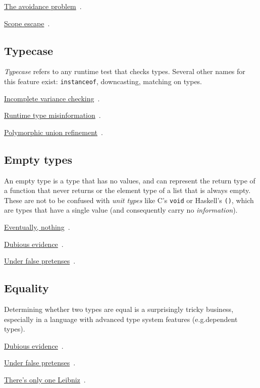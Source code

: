 \documentclass[11pt,oneside]{article}
\newcommand{\code}[1]{\texttt{#1}}
\newenvironment{indexlist}
  {\par\vspace{0.3\baselineskip}\begingroup
   \setlength{\parindent}{0pt}\setlength{\parskip}{1pt}\small}
  {\endgroup\par\vspace{0.2\baselineskip}}
\newcommand{\indexitem}[2]{%
  \makebox[1.2em]{}\hyperref[#1]{#2}%
  \nobreak\hspace{0.4em}\textcolor{sageline}{\leaders\hbox{\,.\,}\hfill}%
  \hspace{0.4em}\nobreak\textcolor{stone}{\pageref{#1}}\par}
\begin{document}
\begin{indexlist}
\indexitem{ce:avoidance}{The avoidance problem}
\indexitem{ce:scope-escape}{Scope escape}
\end{indexlist}

\subsection*{Typecase}\label{gloss:typecase}
\emph{Typecase} refers to any runtime test that checks types. Several other names for this feature exist: \code{instanceof}, downcasting, matching on types.

\begin{indexlist}
\indexitem{ce:incomplete-variance}{Incomplete variance checking}
\indexitem{ce:runtime-misinformation}{Runtime type misinformation}
\indexitem{ce:polymorphic-union-refinement}{Polymorphic union refinement}
\end{indexlist}

\subsection*{Empty types}\label{gloss:empty-types}
An empty type is a type that has no values, and can represent the return type of a function that never returns or the element type of a list that is always empty. These are not to be confused with \emph{unit types} like C's \code{void} or Haskell's \code{()}, which are types that have a single value (and consequently carry no \emph{information}).

\begin{indexlist}
\indexitem{ce:eventually-nothing}{Eventually, nothing}
\indexitem{ce:dubious-evidence}{Dubious evidence}
\indexitem{ce:false-pretenses}{Under false pretenses}
\end{indexlist}

\subsection*{Equality}\label{gloss:equality}
Determining whether two types are equal is a surprisingly tricky business, especially in a language with advanced type system features (e.g.\@  dependent types).

\begin{indexlist}
\indexitem{ce:dubious-evidence}{Dubious evidence}
\indexitem{ce:false-pretenses}{Under false pretenses}
\indexitem{ce:only-one-leibniz}{There's only one Leibniz}
\end{indexlist}
\end{document}
